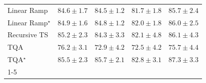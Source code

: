 \begin{tabular}{l|cccc|}
Linear Ramp & {\cellcolor[HTML]{045382}} \color[HTML]{F1F1F1} $84.6\pm 1.7$ & {\cellcolor[HTML]{045382}} \color[HTML]{F1F1F1} $84.5\pm 1.2$ & {\cellcolor[HTML]{04649D}} \color[HTML]{F1F1F1} $81.7\pm 1.8$ & {\cellcolor[HTML]{034A74}} \color[HTML]{F1F1F1} $85.7\pm 2.4$ \\
Linear Ramp$^\star$ & {\cellcolor[HTML]{03517E}} \color[HTML]{F1F1F1} $84.9\pm 1.6$ & {\cellcolor[HTML]{03517E}} \color[HTML]{F1F1F1} $84.8\pm 1.2$ & {\cellcolor[HTML]{046299}} \color[HTML]{F1F1F1} $82.0\pm 1.8$ & {\cellcolor[HTML]{034871}} \color[HTML]{F1F1F1} $86.0\pm 2.5$ \\
Recursive TS & {\cellcolor[HTML]{034D79}} \color[HTML]{F1F1F1} $85.2\pm 2.3$ & {\cellcolor[HTML]{045585}} \color[HTML]{F1F1F1} $84.3\pm 3.3$ & {\cellcolor[HTML]{046299}} \color[HTML]{F1F1F1} $82.1\pm 4.8$ & {\cellcolor[HTML]{03476F}} \color[HTML]{F1F1F1} $86.1\pm 4.3$ \\
TQA & {\cellcolor[HTML]{2685BB}} \color[HTML]{F1F1F1} $76.2\pm 3.1$ & {\cellcolor[HTML]{509AC6}} \color[HTML]{F1F1F1} $72.9\pm 4.2$ & {\cellcolor[HTML]{569DC8}} \color[HTML]{F1F1F1} $72.5\pm 4.2$ & {\cellcolor[HTML]{2C89BD}} \color[HTML]{F1F1F1} $75.7\pm 4.4$ \\
TQA$^\star$ & {\cellcolor[HTML]{034B76}} \color[HTML]{F1F1F1} $85.5\pm 2.3$ & {\cellcolor[HTML]{034A74}} \color[HTML]{F1F1F1} $85.7\pm 2.1$ & {\cellcolor[HTML]{045E94}} \color[HTML]{F1F1F1} $82.8\pm 3.1$ & {\cellcolor[HTML]{023D60}} \color[HTML]{F1F1F1} $87.3\pm 3.3$ \\
\cline{1-5}
\bottomrule
\end{tabular}
